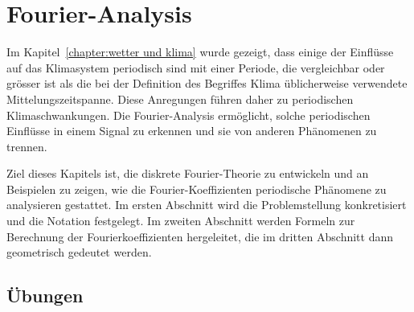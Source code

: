 %
%
%
\chapter{Fourier-Analysis\label{chapter:fourier}}
\rhead{ }
Im Kapitel~\ref{chapter:wetter und klima} wurde gezeigt, dass einige der
Einflüsse
auf das Klimasystem periodisch sind mit einer Periode, die vergleichbar
oder grösser ist als die bei der Definition des Begriffes Klima üblicherweise
verwendete Mittelungszeitspanne.
Diese Anregungen führen daher zu periodischen Klimaschwankungen.
Die Fourier-Analysis ermöglicht, solche periodischen Einflüsse in
einem Signal zu erkennen und sie von anderen Phänomenen zu trennen.

Ziel dieses Kapitels ist, die diskrete Fourier-Theorie zu entwickeln und
an Beispielen zu zeigen, wie die Fourier-Koeffizienten periodische Phänomene
zu analysieren gestattet.
Im ersten Abschnitt wird die Problemstellung konkretisiert und die
Notation festgelegt.
Im zweiten Abschnitt werden Formeln zur Berechnung der Fourierkoeffizienten
hergeleitet, die im dritten Abschnitt dann geometrisch gedeutet werden.





\section*{Übungen}
\begin{uebungsaufgaben}
\item

\end{uebungsaufgaben}

